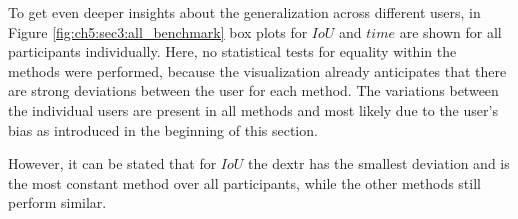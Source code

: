 To get even deeper insights about the generalization across different users, in Figure \ref{fig:ch5:sec3:all_benchmark} box plots for $ IoU $ and $ time $ are shown for all participants individually.
Here, no statistical tests for equality within the methods were performed, because the visualization already anticipates that there are strong deviations between the user for each method.
The variations between the individual users are present in all methods and most likely due to the user's bias as introduced in the beginning of this section.

However, it can be stated that for $IoU$ the \gls{dextr} has the smallest deviation and is the most constant method over all participants, while the other methods still perform similar.

